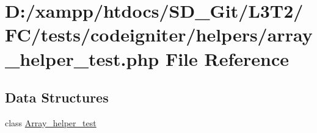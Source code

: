\hypertarget{tests_2codeigniter_2helpers_2array__helper__test_8php}{}\section{D\+:/xampp/htdocs/\+S\+D\+\_\+\+Git/\+L3\+T2/\+F\+C/tests/codeigniter/helpers/array\+\_\+helper\+\_\+test.php File Reference}
\label{tests_2codeigniter_2helpers_2array__helper__test_8php}
\subsection*{Data Structures}
\begin{DoxyCompactItemize}
\item 
class \hyperlink{class_array__helper__test}{Array\+\_\+helper\+\_\+test}
\end{DoxyCompactItemize}
